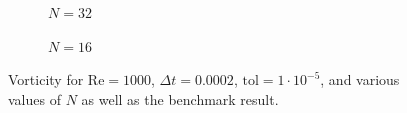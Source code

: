 \begin{figure}[p]
    \vspace{1cm}
    
    \begin{subfigure}[b]{0.49\textwidth}
	    \caption{$N = 32$}
    	\label{fig:ve}
    \end{subfigure}
    \begin{subfigure}[b]{0.49\textwidth}
	    \caption{$N = 16$}
	    \label{fig:vf}
    \end{subfigure}
    \caption{Vorticity for $\text{Re} = 1000$, $\Delta t = 0.0002$, $\text{tol} = 1 \cdot 10^{-5}$, and various values of $N$ as well as the benchmark result.}
    \label{fig:allvorticity}
\end{figure}

